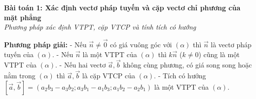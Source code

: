 \documentclass[12pt,a4paper]{article}
\newenvironment{lesson}[2]{
	\vspace{1em}\noindent\textbf{\Large #1}\\
	\textit{#2}\vspace{0.5em}
}{}
\begin{document}
\begin{lesson}{Bài toán 1: Xác định vectơ pháp tuyến và cặp vectơ chỉ phương của mặt phẳng}{Phương pháp xác định VTPT, cặp VTCP và tính tích có hướng}

\textbf{Phương pháp giải:}
- Nếu $\vec{n} \neq \vec{0}$ có giá vuông góc với $(\alpha)$ thì $\vec{n}$ là vectơ pháp tuyến của $(\alpha)$.
- Nếu $\vec{n}$ là một VTPT của $(\alpha)$ thì $k\vec{n}$ ($k \neq 0$) cũng là một VTPT của $(\alpha)$.
- Nếu hai vectơ $\vec{a}, \vec{b}$ không cùng phương, có giá song song hoặc nằm trong $(\alpha)$ thì $\vec{a}, \vec{b}$ là cặp VTCP của $(\alpha)$.
- Tích có hướng $[\vec{a}, \vec{b}] = (a_2 b_3 - a_3 b_2; a_3 b_1 - a_1 b_3; a_1 b_2 - a_2 b_1)$ là một VTPT của $(\alpha)$.

\end{lesson}
\end{document}
